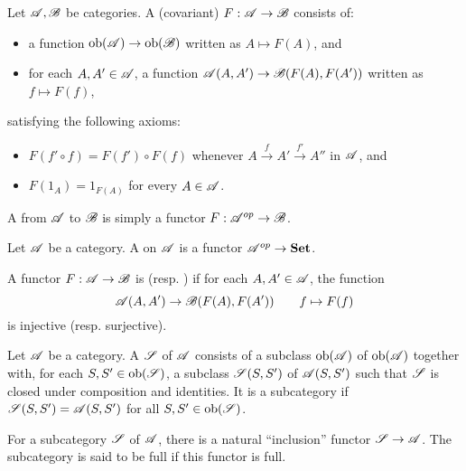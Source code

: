 \begin{definition}
    Let $\mathscr A,\mathscr B$ be categories. A (covariant)  $F: \mathscr A\to\mathscr B$ consists of: 
    \begin{itemize}
        \item a function $\operatorname{ob}(\mathscr A)\to\operatorname{ob}(\mathscr B)$ written as $A\mapsto F(A)$, and
        \item for each $A, A'\in\mathscr A$, a function $\mathscr A(A, A')\to\mathscr B(F(A), F(A'))$ written as $f\mapsto F(f)$,
    \end{itemize}
    satisfying the following axioms: 
    \begin{itemize}
        \item $F(f'\circ f) = F(f')\circ F(f)$ whenever $A\xrightarrow{f} A'\xrightarrow{f'} A''$ in $\mathscr A$, and
        \item $F(1_A) = 1_{F(A)}$ for every $A\in\mathscr A$.
    \end{itemize}

    A  from $\mathscr A$ to $\mathscr B$ is simply a functor $F:\mathscr A^{op}\to\mathscr B$.
\end{definition}

\begin{definition}
    Let $\mathscr A$ be a category. A  on $\mathscr A$ is a functor $\mathscr A^{op}\to\mathbf{Set}$.
\end{definition}

\begin{definition}
    A functor $F:\mathscr A\to\mathscr B$ is  (resp. ) if for each $A, A'\in\mathscr A$, the function 
    \begin{equation*}
        \mathscr A(A, A')\to\mathscr B(F(A), F(A'))\qquad f\mapsto F(f)
    \end{equation*}
    is injective (resp. surjective).
\end{definition}

\begin{definition}
    Let $\mathscr A$ be a category. A  $\mathscr S$ of $\mathscr A$ consists of a subclass $\operatorname{ob}(\mathscr A)$ of $\operatorname{ob}(\mathscr A)$ together with, for each $S, S'\in\operatorname{ob}(\mathscr S)$, a subclass $\mathscr S(S, S')$ of $\mathscr A(S, S')$ such that $\mathscr S$ is closed under composition and identities. It is a  subcategory if $\mathscr S(S, S') = \mathscr A(S, S')$ for all $S, S'\in\operatorname{ob}(\mathscr S)$.
\end{definition}

\begin{remark}
    For a subcategory $\mathscr S$ of $\mathscr A$, there is a natural ``inclusion'' functor $\mathscr S\to\mathscr A$. The subcategory is said to be full if this functor is full.
\end{remark}


